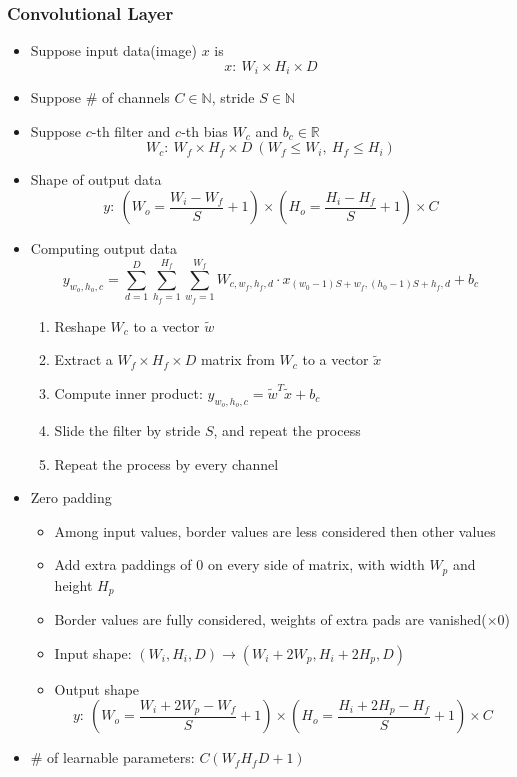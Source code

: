 \subsubsection*{Convolutional Layer}
\begin{itemize}
    \item Suppose input data(image) $x$ is
    \begin{equation}
        x:~W_i\times H_i\times D
    \end{equation}
    \item Suppose \# of channels $C\in\mathbb{N}$, stride $S\in\mathbb{N}$
    \item Suppose $c$-th filter and $c$-th bias $W_c$ and $b_c\in\mathbb{R}$
    \begin{equation}
        W_c:~W_f\times H_f\times D~(W_f\leq W_i,~H_f\leq H_i)
    \end{equation}
    \item Shape of output data
    \begin{equation}
        y:~\left(W_o=\frac{W_i-W_f}{S}+1\right)\times\left(H_o=\frac{H_i-H_f}{S}+1\right)\times C
    \end{equation}
    \item Computing output data
    \begin{equation}
        y_{w_o,h_o,c}=\sum_{d=1}^D\sum_{h_f=1}^{H_f}\sum_{w_f=1}^{W_f}W_{c,w_f,h_f,d}\cdot x_{(w_0-1)S+w_f,(h_0-1)S+h_f,d}+b_c
    \end{equation}
    \begin{enumerate}
        \item Reshape $W_c$ to a vector $\tilde{w}$
        \item Extract a $W_f\times H_f\times D$ matrix from $W_c$ to a vector $\tilde{x}$
        \item Compute inner product: $y_{w_o,h_o,c}=\tilde{w}^T\tilde{x}+b_c$
        \item Slide the filter by stride $S$, and repeat the process
        \item Repeat the process by every channel
    \end{enumerate}
    \item Zero padding
    \begin{itemize}
        \item Among input values, border values are less considered then other values
        \item Add extra paddings of 0 on every side of matrix, with width $W_p$ and height $H_p$
        \item Border values are fully considered, weights of extra pads are vanished($\times 0$)
        \item Input shape: $(W_i,H_i,D)\to(W_i+2W_p,H_i+2H_p,D)$
        \item Output shape
        \begin{equation}
            y:~\left(W_o=\frac{W_i+2W_p-W_f}{S}+1\right)\times\left(H_o=\frac{H_i+2H_p-H_f}{S}+1\right)\times C
        \end{equation}
    \end{itemize}
    \item \# of learnable parameters: $C(W_fH_fD+1)$
\end{itemize}

